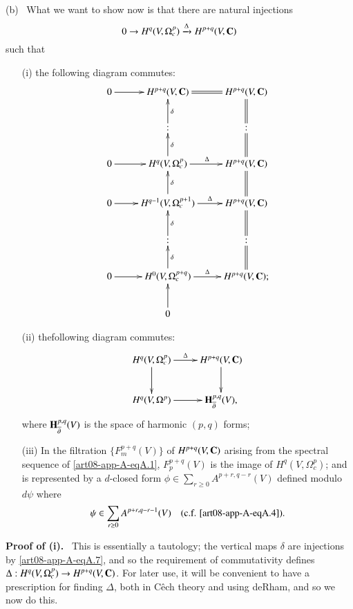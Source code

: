 (b)~ What we want to show now is that there are natural injections
\begin{equation}
0\to H^{q}(V,\Omega^{p}_{c})\xrightarrow{\Delta}H^{p+q}(V,\mathbf{C})\label{art08-app-A-eqA.15} 
\end{equation}
such that
\begin{itemize}
\item[(i)] the following diagram commutes:
\begin{equation}
\vcenter{\xymatrix{
0\ar[r] & H^{p+q}(V,\bfC)\ar@{=}[r] & H^{p+q}(V,\bfC)\\
 & :\ar[u]_-{\delta} & :\ar@{=}[u]\\
0\ar[r] & H^{q}(V,\Omega^{p}_{c})\ar[u]_-{\delta} \ar[r]^{\Delta} & H^{p+q}(V,\bfC)\ar@{=}[u]\\
0\ar[r] & H^{q-1}(V,\Omega^{p+1}_{c})\ar[u]_-{\delta}\ar[r]^-{\Delta} & H^{p+q}(V,\bfC)\ar@{=}[u]\\
 & :\ar[u]_-{\delta} & :\ar@{=}[u]\\
0\ar[r] & H^{0}(V,\Omega^{p+q}_{c})\ar[u]_-{\delta}\ar[r]^-{\Delta} & H^{p+q}(V,\bfC);\ar@{=}[u]\\
 & 0\ar[u] & 
}}\label{art08-app-A-eqA.16} 
\end{equation}

\item[(ii)] the\pageoriginale following diagram commutes:
\begin{equation}
\vcenter{\xymatrix{
H^{q}(V,\Omega^{p}_{c})\ar[d]\ar[r]^-{\Delta} & H^{p+q}(V,\bfC)\ar[d]\\
H^{q}(V,\Omega^{p})\ar[r] & \bfH^{p,q}_{\overline{\partial}}(V),
}}\label{art08-app-A-eqA.17} 
\end{equation}
where $\mathbf{H}^{p,q}_{\overline{\partial}}(V)$ is the space of harmonic $(p,q)$ forms;

\item[(iii)] In the filtration $\{F^{p+q}_{m}(V)\}$ of $H^{p+q}(V,\mathbf{C})$ arising from the spectral sequence of \eqref{art08-app-A-eqA.1}, $F^{p+q}_{p}(V)$ is the image of $H^{q}(V,\Omega^{p}_{c})$; and is represented by a $d$-closed form $\phi\in \sum\limits_{r\geq 0}A^{p+r,q-r}(V)$ defined modulo $d\psi$ where 
\begin{equation}
\psi\in \sum\limits_{r\geq 0}A^{p+r,q-r-1}(V)\quad\text{(c.f. \eqref{art08-app-A-eqA.4}).}\label{art08-app-A-eqA.18}
\end{equation}
\end{itemize}

\noindent
{\bf Proof of (i).}~ This is essentially a tautology; the vertical maps $\delta$ are injections by \eqref{art08-app-A-eqA.7}, and so the requirement of commutativity defines $\Delta : H^{q}(V,\Omega^{p}_{c})\to H^{p+q}(V,\mathbf{C})$. For later use, it will be convenient to have a prescription for finding $\Delta$, both in C\^ech theory and using deRham, and so we now do this.


